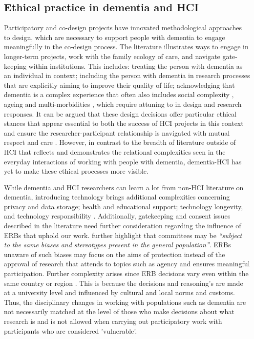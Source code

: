 \subsection{Ethical practice in dementia and HCI}
\label{BL:gap:Ethics}
Participatory and co-design projects have innovated methodological approaches to design, which are necessary to support people with dementia to engage meaningfully in the co-design process. The literature illustrates ways to engage in longer-term projects, work with the family ecology of care, and navigate gate-keeping within institutions. This includes: treating the person with dementia as an individual in context; including the person with dementia in research processes that are explicitly aiming to improve their quality of life; acknowledging that dementia is a complex experience that often also includes social complexity \citep{keyes2019living}, ageing and multi-morbidities \citep{buse_materialising_2016}, which require attuning to in design and research responses. It can be argued that these design decisions offer particular ethical stances that appear essential to both the success of HCI projects in this context and ensure the researcher-participant relationship is navigated with mutual respect and care \citep{foley_care_2019}. However, in contrast to the breadth of literature outside of HCI that reflects and demonstrates the relational complexities seen in the everyday interactions of working with people with dementia, dementia-HCI has yet to make these ethical processes more visible.

While dementia and HCI researchers can learn a lot from non-HCI literature on dementia, introducing technology brings additional complexities concerning privacy and data storage; health and educational support; technology longevity, and technology responsibility \citep{cornejo_vulnerability_2016}. Additionally, gatekeeping and consent issues described in the literature need further consideration regarding the influence of ERBs that uphold our work. \cite{pachana_can_2014} further highlight that committees may be \textit{``subject to the same biases and stereotypes present in the general population''}. ERBs unaware of such biases may focus on the aims of protection instead of the approval of research that attends to topics such as agency and ensures meaningful participation. Further complexity arises since ERB decisions vary even within the same country or region \citep{edwards_research_2004}. This is because the decisions and reasoning's are made at a university level and influenced by cultural and local norms and customs. Thus, the disciplinary changes in working with populations such as dementia are not necessarily matched at the level of those who make decisions about what research is and is not allowed when carrying out participatory work with participants who are considered 'vulnerable'.

